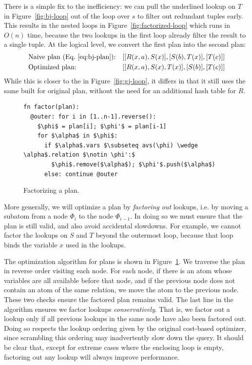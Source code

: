 There is a simple fix to the inefficiency: we can pull the underlined
lookup on $T$ in Figure~\ref{fig:bj-loop} out of the loop over $s$ to
filter out redundant tuples early.  This results in the nested loops
in Figure~\ref{fig:factorized-loop} which runs in $O(n)$ time, because
the two lookups in the first loop already filter the result to a
single tuple.  At the logical level, we convert the first \FJ plan
into the second \FJ plan:
  \begin{align*}
&\mbox{Naive plan (Eq.~\eqref{eq:bj-plan}):}&& [[R(x, a), S(x)], [S(b), T(x)], [T(c)]]\\
&\mbox{Optimized plan:} && [[R(x, a), S(x), T(x)], [S(b)], [T(c)]]
  \end{align*}
  While this is closer to the \GJ in Figure~\ref{fig:gj-loop}, it
  differs in that it still uses the same \GHTs built for original
  plan, without the need for an additional hash table for $R$.

\begin{figure}
  \begin{lstlisting}
fn factor(plan):
  @outer: for i in [1..n-1].reverse():
    $\phi$ = plan[i]; $\phi'$ = plan[i-1]
    for $\alpha$ in $\phi$:
      if $\alpha$.vars $\subseteq avs(\phi) \wedge \alpha$.relation $\notin \phi':$
        $\phi$.remove($\alpha$); $\phi'$.push($\alpha$)
      else: continue @outer
  \end{lstlisting}
  \caption{Factorizing a \FJ plan.}
  \label{fig:factorize-plan}
\end{figure}

More generally, we will optimize a \FJ plan by \emph{factoring out}
lookups, i.e. by moving a subatom from a node $\Phi_i$ to the node
$\Phi_{i-1}$.  In doing so we must ensure that the plan is still
valid, and also avoid accidental slowdowns.  For example, we cannot
factor the lookups on $S$ and $T$ beyond the outermost loop, because
that loop binds the variable $x$ used in the lookups.

The optimization algorithm for \FJ plans is shown in
Figure~\ref{fig:factorize-plan}. We traverse the plan in reverse order
visiting each node. For each node, if there is an atom whose variables
are all available before that node, and if the previous node does not
contain an atom of the same relation, we move the atom to the previous
node. These two checks ensure the factored plan remains valid.  The
last line in the algorithm ensures we factor lookups
\emph{conservatively}. That is, we factor out a lookup only if all
previous lookups in the same node have also been factored out. Doing
so respects the lookup ordering given by the original cost-based
optimizer, since scrambling this ordering may inadvertently slow down
the query. It should be clear that, except for extreme cases where the
enclosing loop is empty, factoring out any lookup will always improve
performance.


